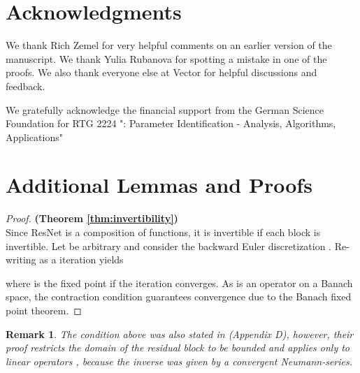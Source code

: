 \documentclass{article}
\newtheorem{remark}[theorem]{Remark}
\begin{document}
\section*{Acknowledgments}
We thank Rich Zemel for very helpful comments on an earlier version of the manuscript. We thank Yulia Rubanova for spotting a mistake in one of the proofs. We also thank everyone else at Vector for helpful discussions and feedback.

We gratefully acknowledge the financial support from the German Science Foundation for RTG 2224 ": Parameter Identification - Analysis, Algorithms, Applications"









\appendix
\onecolumn
\newpage


\section{Additional Lemmas and Proofs}
\label{sec:lemmasAndProofs}
\begin{proof}\textbf{(Theorem \ref{thm:invertibility})}\\
Since ResNet  is a composition of functions, it is invertible if each block  is invertible. Let  be arbitrary and consider the backward Euler discretization . Re-writing as a iteration yields

where  is the fixed point if the iteration converges. As  is an operator on a Banach space, the contraction condition  guarantees convergence due to the Banach fixed point theorem.
\end{proof}
\begin{remark}
The condition above was also stated in \citet{zhao2019information} (Appendix D), however, their proof restricts the domain of the residual block  to be bounded and applies only to linear operators , because the inverse was given by a convergent Neumann-series.
\end{remark}

\iffalse
\begin{proof}\textbf{(Lemma \ref{thm:lipForwardInverse})}\\
First note, that  follows directly from the addition of Lipschitz constants. For the inverse, consider the reverse triangular inequality and apply the Lipschitz constant of 

Denote  and  for , which is possible since  is surjective. Inserting above yields

which holds for all .
\end{proof}
\fi
\end{document}
